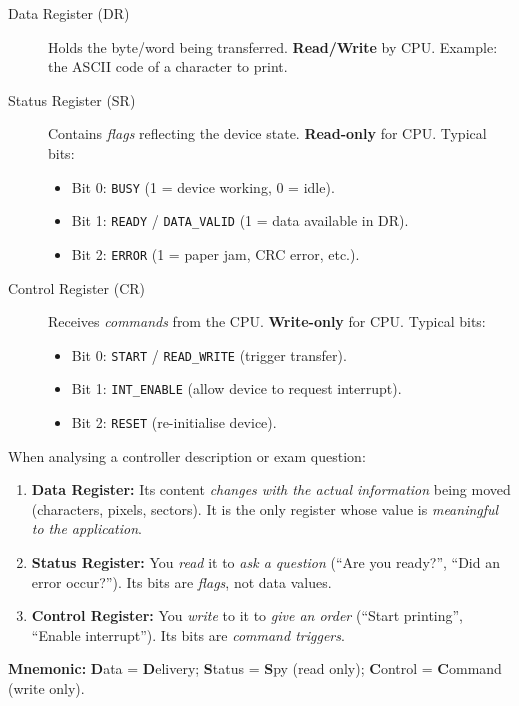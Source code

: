 \documentclass[11pt]{article}
\newcommand{\cle}[1]{{\popxbold\color{popdark}#1}}
\begin{document}
\begin{description}
    \item[\cle{Data Register (DR)}] Holds the byte/word being transferred. \textbf{Read/Write} by CPU. Example: the ASCII code of a character to print.
    \item[\cle{Status Register (SR)}] Contains \emph{flags} reflecting the device state. \textbf{Read-only} for CPU. Typical bits:
    \begin{itemize}
        \item Bit 0: \texttt{BUSY} (1 = device working, 0 = idle).
        \item Bit 1: \texttt{READY} / \texttt{DATA\_VALID} (1 = data available in DR).
        \item Bit 2: \texttt{ERROR} (1 = paper jam, CRC error, etc.).
    \end{itemize}
    \item[\cle{Control Register (CR)}] Receives \emph{commands} from the CPU. \textbf{Write-only} for CPU. Typical bits:
    \begin{itemize}
        \item Bit 0: \texttt{START} / \texttt{READ\_WRITE} (trigger transfer).
        \item Bit 1: \texttt{INT\_ENABLE} (allow device to request interrupt).
        \item Bit 2: \texttt{RESET} (re-initialise device).
    \end{itemize}
\end{description}

\begin{methode}
When analysing a controller description or exam question:
\begin{enumerate}
    \item \textbf{Data Register:} Its content \emph{changes with the actual information} being moved (characters, pixels, sectors). It is the only register whose value is \emph{meaningful to the application}.
    \item \textbf{Status Register:} You \emph{read} it to \emph{ask a question} (``Are you ready?'', ``Did an error occur?''). Its bits are \emph{flags}, not data values.
    \item \textbf{Control Register:} You \emph{write} to it to \emph{give an order} (``Start printing'', ``Enable interrupt''). Its bits are \emph{command triggers}.
\end{enumerate}
\textbf{Mnemonic:} \textbf{D}ata = \textbf{D}elivery; \textbf{S}tatus = \textbf{S}py (read only); \textbf{C}ontrol = \textbf{C}ommand (write only).
\end{methode}
\end{document}
